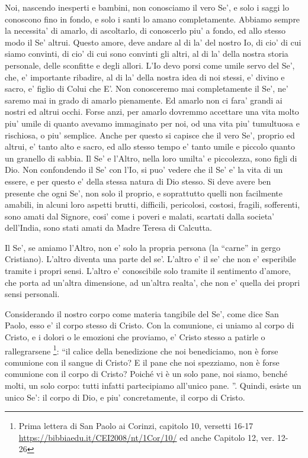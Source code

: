Noi, nascendo inesperti e bambini, non conosciamo il vero Se', e solo i saggi lo conoscono fino in fondo, e solo i santi lo amano completamente. Abbiamo sempre la necessita' di amarlo, di ascoltarlo, di conoscerlo piu' a fondo, ed allo stesso modo il Se' altrui.  Questo amore, deve andare al di la' del nostro Io, di cio' di cui siamo convinti, di cio' di cui sono convinti gli altri, al di la' della nostra storia personale, delle sconfitte e degli allori. L'Io devo porsi come umile servo del Se', che, e' importante ribadire, al di la' della nostra idea di noi stessi, e' divino e sacro, e' figlio di Colui che E'. Non conosceremo mai completamente il Se', ne' saremo mai in grado di amarlo pienamente. Ed amarlo non ci fara' grandi ai nostri ed altrui occhi. Forse anzi, per amarlo dovremmo accettare una vita molto piu' umile di quanto avevamo immaginato per noi, od una vita piu' tumultuosa e rischiosa, o piu' semplice. Anche per questo si capisce che il vero Se', proprio ed altrui, e' tanto alto e sacro, ed allo stesso tempo e' tanto umile e piccolo quanto un granello di sabbia. Il Se' e l'Altro, nella loro umilta' e piccolezza, sono figli di Dio. Non confondendo il Se' con l'Io, si puo' vedere che il Se' e' la vita di un essere, e per questo e' della stessa natura di Dio stesso. Si deve avere ben presente che ogni Se', non solo il proprio, e soprattutto quelli non facilmente amabili, in alcuni loro aspetti brutti, difficili, pericolosi, costosi, fragili, sofferenti, sono amati dal Signore, cosi' come i poveri e malati, scartati dalla societa' dell'India, sono stati amati da Madre Teresa di Calcutta.

Il Se', se amiamo l'Altro, non e' solo la propria persona (la ``carne'' in gergo Cristiano). L'altro diventa una parte del se'. L'altro e' il se' che non e' esperibile tramite i propri sensi. L'altro e' conoscibile solo tramite il sentimento d'amore, che porta ad un'altra dimensione, ad un'altra realta', che non e' quella dei propri sensi personali. 

Considerando il nostro corpo come materia tangibile del Se', come dice San Paolo, esso e' il corpo stesso di Cristo. Con la comunione, ci uniamo al corpo di Cristo, e i dolori o le emozioni che proviamo, e' Cristo stesso a patirle o rallegrarsene \footnote{Prima lettera di San Paolo ai Corinzi, capitolo 10, versetti 16-17 \url{https://bibbiaedu.it/CEI2008/nt/1Cor/10/} ed anche Capitolo 12, ver. 12-26}: ``il calice della benedizione che noi benediciamo, non è forse comunione con il sangue di Cristo? E il pane che noi spezziamo, non è forse comunione con il corpo di Cristo? Poiché vi è un solo pane, noi siamo, benché molti, un solo corpo: tutti infatti partecipiamo all'unico pane. ''.
Quindi, esiste un unico Se': il corpo di Dio, e piu' concretamente, il corpo di Cristo.


